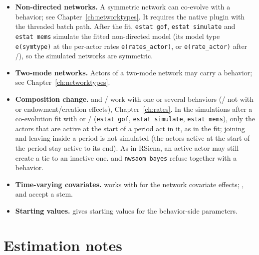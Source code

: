 \begin{itemize}[nosep]
\item \textbf{Non-directed networks.} A symmetric network can co-evolve with a behavior; see Chapter~\ref{ch:networktypes}. It requires the native plugin with the threaded batch path. After the fit, \texttt{estat gof}, \texttt{estat simulate} and \texttt{estat mems} simulate the fitted non-directed model (its model type \texttt{e(symtype)} at the per-actor rates \texttt{e(rates\_actor)}, or \texttt{e(rate\_actor)} after /), so the simulated networks are symmetric.
\item \textbf{Two-mode networks.} Actors of a two-mode network may carry a behavior; see Chapter~\ref{ch:networktypes}.
\item \textbf{Composition change.}  and / work with one or several behaviors (/ not with  or endowment/creation effects), Chapter~\ref{ch:rates}. In the simulations after a co-evolution fit with  or / (\texttt{estat gof}, \texttt{estat simulate}, \texttt{estat mems}), only the actors that are active at the start of a period act in it, as in the fit; joining and leaving inside a period is not simulated (the actors active at the start of the period stay active to its end). As in RSiena, an active actor may still create a tie to an inactive one.  and \texttt{nwsaom bayes} refuse  together with a behavior.
\item \textbf{Time-varying covariates.}  works with  for the network covariate effects; ,  and  accept a  stem.
\item \textbf{Starting values.}  gives starting values for the behavior-side parameters.
\end{itemize}

\section{Estimation notes}

